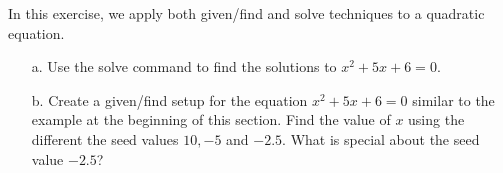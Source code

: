 {In this exercise, we apply both given/find and solve techniques to a quadratic equation.
\begin{enumerate}
\item[a.] Use the solve command to find the solutions to $x^2 + 5x + 6 = 0$.
\item[b.] Create a given/find setup for the equation $x^2 + 5x + 6 = 0$ similar to the example at the beginning of this section.  
Find the value of $x$ using the different the seed values $10,-5$ and $-2.5$.  What is special about the seed value $-2.5$?  
\end{enumerate}}
{}